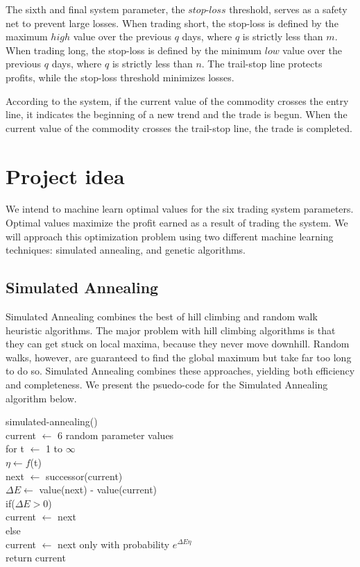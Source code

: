 \documentclass[10pt]{article}
\begin{document}
The sixth and final system parameter, the $stop$-$loss$ threshold, serves as a
safety net to prevent large losses.  When trading short, the stop-loss is
defined by the maximum $high$ value over the previous $q$ days, where $q$ is
strictly less than $m$.  When trading long, the stop-loss is defined by the
minimum $low$ value over the previous $q$ days, where $q$ is strictly less than
$n$.  The trail-stop line protects profits, while the stop-loss threshold
minimizes losses.

According to the system, if the current value of the commodity crosses the entry
line, it indicates the beginning of a new trend and the trade is begun.  When
the current value of the commodity crosses the trail-stop line, the trade is
completed.

\section{Project idea}

We intend to machine learn optimal values for the six trading system parameters.
Optimal values maximize the profit earned as a result of trading the system.  We
will approach this optimization problem using two different machine learning
techniques: simulated annealing, and genetic algorithms.

\subsection{Simulated Annealing}

Simulated Annealing combines the best of hill climbing and random walk heuristic
algorithms.  The major problem with hill climbing algorithms is that they can
get stuck on local maxima, because they never move downhill.
Random walks, however, are guaranteed to find the global maximum but take far
too long to do so.  Simulated Annealing combines these approaches, yielding both
efficiency and completeness.  We present the psuedo-code for the Simulated
Annealing algorithm below.

\setlength{\parindent}{5mm}
\indent simulated-annealing()\\
\indent \indent current $\leftarrow$ 6 random parameter values\\
\indent \indent for t $\leftarrow$ 1 to $\infty$\\
\indent \indent \indent $\eta \leftarrow f$(t)\\
\indent \indent \indent next $\leftarrow$ successor(current)\\
\indent \indent \indent $\Delta E \leftarrow$ value(next) - value(current)\\
\indent \indent \indent if($\Delta E > 0$)\\
\indent \indent \indent \indent current $\leftarrow$ next\\
\indent \indent \indent else\\
\indent \indent \indent \indent current $\leftarrow$ next only with probability $e^{\Delta E\eta}$\\
\indent \indent return current\\
\setlength{\parindent}{0mm}
\end{document}
